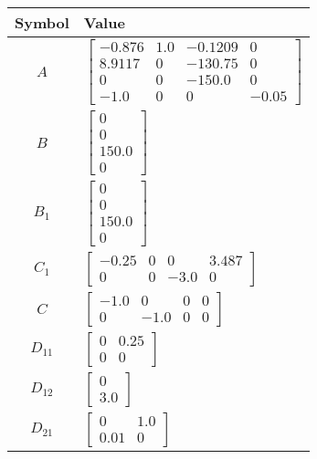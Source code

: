 \begin{tabular}{cl}
\hline
  Symbol  & Value                                                                                                                                   \\
\hline
   $A$    & $\left[\begin{matrix}-0.876 & 1.0 & -0.1209 & 0\\8.9117 & 0 & -130.75 & 0\\0 & 0 & -150.0 & 0\\-1.0 & 0 & 0 & -0.05\end{matrix}\right]$ \\
   $B$    & $\left[\begin{matrix}0\\0\\150.0\\0\end{matrix}\right]$                                                                                 \\
 $B_{1}$  & $\left[\begin{matrix}0\\0\\150.0\\0\end{matrix}\right]$                                                                                 \\
 $C_{1}$  & $\left[\begin{matrix}-0.25 & 0 & 0 & 3.487\\0 & 0 & -3.0 & 0\end{matrix}\right]$                                                        \\
   $C$    & $\left[\begin{matrix}-1.0 & 0 & 0 & 0\\0 & -1.0 & 0 & 0\end{matrix}\right]$                                                             \\
 $D_{11}$ & $\left[\begin{matrix}0 & 0.25\\0 & 0\end{matrix}\right]$                                                                                \\
 $D_{12}$ & $\left[\begin{matrix}0\\3.0\end{matrix}\right]$                                                                                         \\
 $D_{21}$ & $\left[\begin{matrix}0 & 1.0\\0.01 & 0\end{matrix}\right]$                                                                              \\
\hline
\end{tabular}